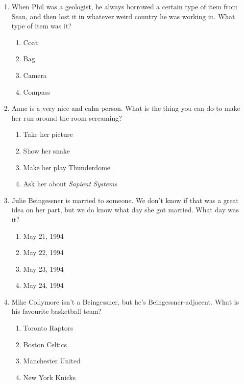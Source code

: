 \documentclass[11pt]{exam}
\begin{document}
\begin{questions}
\begin{enumerate}
\item When Phil was a geologist, he always borrowed a certain type of item from Sean, and then lost it in whatever weird country he was working in. What type of item was it?

\begin{enumerate}
\item{} Coat
\item{} Bag
\item{} Camera
\item{} Compass
\end{enumerate}



\item Anne is a very nice and calm person. What is the thing you can do to make her run around the
room screaming?

\begin{enumerate}
\item{} Take her picture
\item{} Show her snake
\item{} Make her play Thunderdome
\item{} Ask her about \emph{Sapient Systems}
\end{enumerate}



\item Julie Beingessner is married to someone. We don’t know if that was a great idea on her part, but we do know what day she got married. What day was it?

\begin{enumerate}
\item{} May 21, 1994
\item{} May 22, 1994
\item{} May 23, 1994
\item{} May 24, 1994
\end{enumerate}



\item Mike Collymore isn’t a Beingessner, but he’s Beingessner-adjacent. What is his favourite
basketball team?

\begin{enumerate}
\item{} Toronto Raptors
\item{} Boston Celtics
\item{} Manchester United
\item{} New York Knicks
\end{enumerate}


\end{enumerate}
\end{questions}
\end{document}
